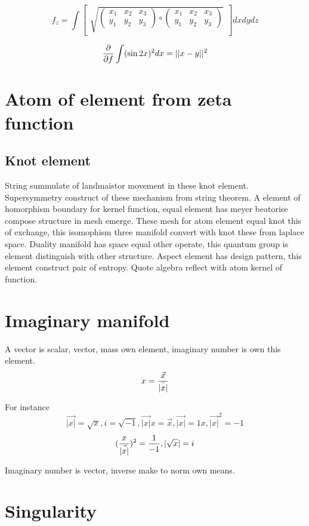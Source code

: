 \documentclass{jsarticle}
\begin{document}
  $$ f_{z} = \int \begin{bmatrix} \sqrt{\begin{pmatrix} x_{1} & x_{2} & x_{3} \\
     y_{1} & y_{2} & y_{3} \end{pmatrix}
     \circ
   \begin{pmatrix} x_{1} & x_{2} & x_{3} \\
     y_{1} & y_{2} & y_{3} \end{pmatrix}}_{}
     \end{bmatrix}dxdydz $$

     $$ {\partial \over \partial f} \int (\sin2x)^2dx = ||x - y||^2 $$

\section{Atom of element from zeta function}
\subsection{Knot element}

  String summulate of landmaistor movement in these knot element. Supersymmetry construct of these mechanism from
string theorem. A element of homorphism boundary for kernel function, equal element has meyer beatorise compose
structure in mesh emerge. These mesh for atom element equal knot this of exchange, this isomophism three manifold 
convert with knot these from laplace space. Duality manifold has space equal other operate, this quantum group is 
element distinguish with other structure. Aspect element has design pattern, this element construct pair of entropy.
Quote algebra reflect with atom kernel of function.

\section{Imaginary manifold}
A vector is scalar, vector, mass own element, imaginary number is own this element.
  $$ x = {\vec{x} \over \bar{|x|}} $$

For instance
  $$ \vec{|x|} = \sqrt{x}, i = \sqrt{-1}, \vec{|x|} x = \vec{x}, \vec{|x|} = 1x, \vec{|x|}^2 = -1 $$
  $$ ({x \over \vec{|x|}})^2 = {1 \over -1}, |\sqrt{x}| = i $$

Imaginary number is vector, inverse make to norm own means.

\section{Singularity}
\end{document}

